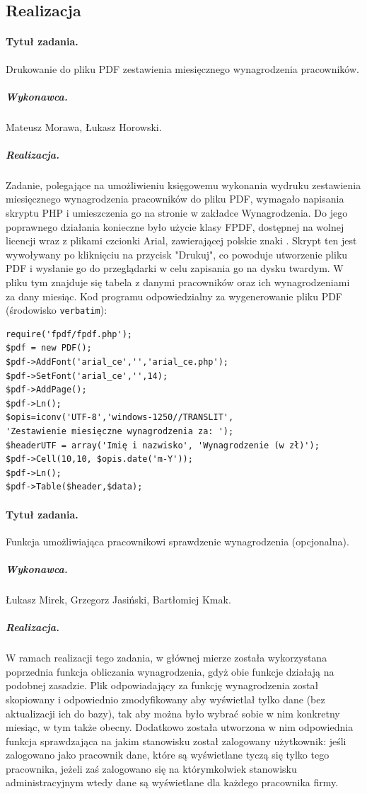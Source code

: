 \documentclass[a4paper]{article}
\begin{document}
\subsection{Realizacja}

\paragraph{Tytuł zadania.} Drukowanie do pliku PDF zestawienia miesięcznego wynagrodzenia pracowników.
\subparagraph{Wykonawca.} Mateusz Morawa, Łukasz Horowski.
\subparagraph{Realizacja.} Zadanie, polegające na umożliwieniu księgowemu wykonania wydruku zestawienia miesięcznego wynagrodzenia pracowników do pliku PDF, wymagało napisania skryptu PHP i umieszczenia go na stronie w zakładce Wynagrodzenia. Do jego poprawnego działania konieczne było użycie klasy FPDF, dostępnej na wolnej licencji wraz z plikami czcionki Arial, zawierającej polskie znaki \cite{FDPF}. Skrypt ten jest wywoływany po kliknięciu na przycisk "Drukuj", co powoduje utworzenie pliku PDF i wysłanie go do przeglądarki w celu zapisania go na dysku twardym. W pliku tym znajduje się tabela z danymi pracowników oraz ich wynagrodzeniami za dany miesiąc. Kod programu odpowiedzialny za wygenerowanie pliku PDF (środowisko \texttt{verbatim}): \begin{verbatim}
require('fpdf/fpdf.php');
$pdf = new PDF();
$pdf->AddFont('arial_ce','','arial_ce.php');
$pdf->SetFont('arial_ce','',14);
$pdf->AddPage();
$pdf->Ln();
$opis=iconv('UTF-8','windows-1250//TRANSLIT',
'Zestawienie miesięczne wynagrodzenia za: ');
$headerUTF = array('Imię i nazwisko', 'Wynagrodzenie (w zł)');
$pdf->Cell(10,10, $opis.date('m-Y'));
$pdf->Ln();
$pdf->Table($header,$data);
\end{verbatim}

\paragraph{Tytuł zadania.} Funkcja umożliwiająca pracownikowi sprawdzenie wynagrodzenia (opcjonalna).
\subparagraph{Wykonawca.} Łukasz Mirek, Grzegorz Jasiński, Bartłomiej Kmak.
\subparagraph{Realizacja.} W ramach realizacji tego zadania, w głównej mierze została wykorzystana poprzednia funkcja obliczania wynagrodzenia, gdyż obie funkcje działają na podobnej zasadzie. Plik odpowiadający za funkcję wynagrodzenia został skopiowany i odpowiednio zmodyfikowany aby wyświetlał tylko dane (bez aktualizacji ich do bazy), tak aby można było wybrać sobie w nim konkretny miesiąc, w tym także obecny. Dodatkowo została utworzona w nim odpowiednia funkcja sprawdzająca na jakim stanowisku został zalogowany użytkownik: jeśli zalogowano jako pracownik dane, które są wyświetlane tyczą się tylko tego pracownika, jeżeli zaś zalogowano się na którymkolwiek stanowisku administracyjnym wtedy dane są wyświetlane dla każdego pracownika firmy.   
 
\end{document}
